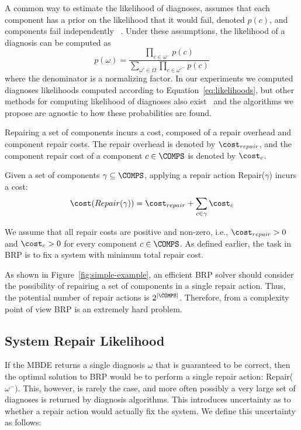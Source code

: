 A common way to estimate the likelihood of diagnoses, assumes that each component has a prior on the likelihood that it would fail, denoted $p(c)$, and components fail independently ~\cite{Stern17shelly}. 
Under these assumptions, the likelihood of a diagnosis can be computed as
\begin{equation}
\displaystyle p(\omega)=\frac{\prod_{c\in\omega^{-}} p(c)}{\sum_{\omega'\in\Omega}{\prod_{c\in\omega'^{-}} p(c)}}
\label{eq:likelihoods}
\end{equation}
where the denominator is a normalizing factor. 
In our experiments we computed diagnoses likelihoods computed according to Equation~\ref{eq:likelihoods}, 
but other methods for computing likelihood of diagnoses also exist~\cite{mengshoel2010probabilistic} and the algorithms we propose are agnostic to how these probabilities are found. %

Repairing a set of components incurs a cost, composed of a repair overhead and component repair costs. The repair overhead is denoted by $\cost_{repair}$, and the component repair cost of a component $c\in \COMPS$ is denoted by $\cost_{c}$.


\begin{definition}
Given a set of components $\gamma\subseteq \COMPS$, applying a repair action Repair($\gamma$) incurs a cost:
\[ \cost(Repair(\gamma)) = \cost_{repair} + \sum_{c\in \gamma} \cost_{c} \]
\end{definition}
We assume that all repair costs are positive and non-zero, i.e., $\cost_{repair}>0$ and $\cost_{c}>0$ for every component $c \in \COMPS$. As defined earlier, the task in BRP is to fix a system with minimum total repair cost.


As shown in Figure~\ref{fig:simple-example}, an efficient BRP solver should consider the possibility of repairing a set of components in a single repair action. Thus, the potential number of repair actions is %
$2^{|\COMPS|}$. Therefore, from a complexity point of view BRP is an extremely hard problem.


\subsection{System Repair Likelihood}\label{sec:Repair_Likelihood}
If the MBDE returns a single diagnosis $\omega$ that is guaranteed to be correct, then the optimal solution to BRP would be to perform a single repair action: Repair($\omega^{-})$. %
This, however, is rarely the case, and more often possibly a very large set of diagnoses is returned by diagnosis algorithms. This introduces uncertainty as to whether a repair action would actually fix the system. We define this uncertainty as follows:

